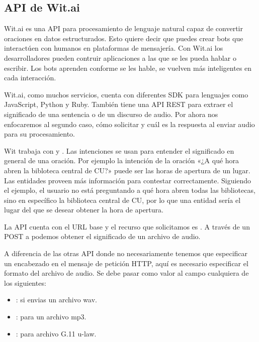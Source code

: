 \subsection{API de Wit.ai}
\label{\detokenize{chapter_one/apis_rest:api-de-wit-ai}}
Wit.ai es una API para procesamiento de lenguaje natural capaz de convertir
oraciones en datos estructurados. Esto quiere decir que puedes crear bots
que interactúen con humanos en plataformas de mensajería. Con Wit.ai los
desarrolladores pueden contruir aplicaciones a las que se les pueda hablar o
escribir. Los bots aprenden conforme se les hable, se vuelven más inteligentes
en cada interacción.

Wit.ai, como muchos servicios, cuenta con diferentes SDK para lenguajes como
JavaScript, Python y Ruby. También tiene una API REST para extraer el significado
de una sentencia o de un discurso de audio. Por ahora nos enfocaremos
al segundo caso, cómo solicitar y cuál es la respuesta al enviar audio
para su procesamiento.

Wit trabaja con  y . Las intenciones se usan para entender
el significado en general de una oración. Por ejemplo la intención
de la oración «¿A qué hora abren la bibloteca central de CU?»
puede ser las horas de apertura de un lugar. Las entidades
proveen más información para contestar correctamente. Siguiendo el ejemplo,
el usuario no está preguntando a qué hora abren todas las bibliotecas,
sino en específico la biblioteca central de CU, por lo que
una entidad sería el lugar del que se desear obtener la hora de apertura.

La API cuenta con el URL base  y el recurso que
solicitamos es . A través de un POST a 
podemos obtener el significado de un archivo de audio.

A diferencia de las otras API donde no necesariamente tenemos que especificar
un encabezado en el mensaje de petición HTTP, aquí es necesario especificar
el formato del archivo de audio. Se debe pasar como valor al campo
 cualquiera de los siguientes:
\begin{itemize}
\item {} 
: si envias un archivo wav.

\item {} 
: para un archivo mp3.

\item {} 
: para archivo G.11 u-law.

\end{itemize}

